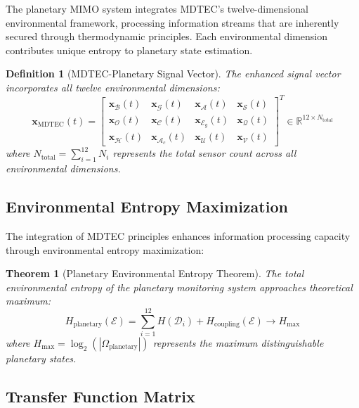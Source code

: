 \documentclass[12pt,a4paper]{article}
\newtheorem{theorem}{Theorem}
\newtheorem{definition}{Definition}
\begin{document}
The planetary MIMO system integrates MDTEC's twelve-dimensional environmental framework, processing information streams that are inherently secured through thermodynamic principles. Each environmental dimension contributes unique entropy to planetary state estimation.

\begin{definition}[MDTEC-Planetary Signal Vector]
The enhanced signal vector incorporates all twelve environmental dimensions:
\begin{equation}
\mathbf{x}_{\text{MDTEC}}(t) = \begin{bmatrix}
\mathbf{x}_{\mathcal{B}}(t) & \mathbf{x}_{\mathcal{G}}(t) & \mathbf{x}_{\mathcal{A}}(t) & \mathbf{x}_{\mathcal{S}}(t) \\
\mathbf{x}_{\mathcal{O}}(t) & \mathbf{x}_{\mathcal{C}}(t) & \mathbf{x}_{\mathcal{E}_g}(t) & \mathbf{x}_{\mathcal{Q}}(t) \\
\mathbf{x}_{\mathcal{H}}(t) & \mathbf{x}_{\mathcal{A}_c}(t) & \mathbf{x}_{\mathcal{U}}(t) & \mathbf{x}_{\mathcal{V}}(t)
\end{bmatrix}^T \in \mathbb{R}^{12 \times N_{\text{total}}}
\end{equation}
where $N_{\text{total}} = \sum_{i=1}^{12} N_i$ represents the total sensor count across all environmental dimensions.
\end{definition}

\subsection{Environmental Entropy Maximization}

The integration of MDTEC principles enhances information processing capacity through environmental entropy maximization:

\begin{theorem}[Planetary Environmental Entropy Theorem]
The total environmental entropy of the planetary monitoring system approaches theoretical maximum:
\begin{equation}
H_{\text{planetary}}(\mathcal{E}) = \sum_{i=1}^{12} H(\mathcal{D}_i) + H_{\text{coupling}}(\mathcal{E}) \to H_{\text{max}}
\end{equation}
where $H_{\text{max}} = \log_2(|\Omega_{\text{planetary}}|)$ represents the maximum distinguishable planetary states.
\end{theorem}

\subsection{Transfer Function Matrix}
\end{document}
